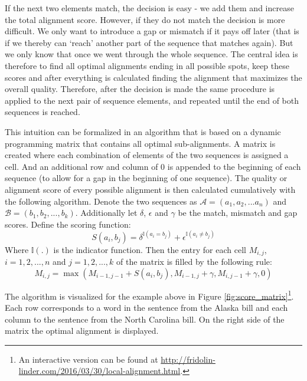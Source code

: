 \documentclass[12pt]{article} %
\begin{document}
If the next two elements match, the decision is easy - we add them and increase the total alignment score. However, if they do not match the decision is more difficult. We only want to introduce a gap or mismatch if it pays off later (that is if we thereby can `reach' another part of the sequence that matches again). But we only know that once we went through the whole sequence. The central idea is therefore to find all optimal alignments ending in all possible spots, keep these scores and after everything is calculated finding the alignment that maximizes the overall quality. Therefore, after the decision is made the same procedure is applied to the next pair of sequence elements, and repeated until the end of both sequences is reached.

This intuition can be formalized in an algorithm that is based on a dynamic programming matrix that contains all optimal sub-alignments. A matrix is created where each combination of elements of the two sequences is assigned a cell. And an additional row and column of 0 is appended to the beginning of each sequence (to allow for a gap in the beginning of one sequence). The quality or alignment score of every possible alignment is then calculated cumulatively with the following algorithm. Denote the two sequences as $\mathcal{A} = (a_1, a_2, ... a_n)$ and $\mathcal{B} = (b_1, b_2, ..., b_k)$. Additionally let $\delta$, $\epsilon$ and $\gamma$ be the match, mismatch and gap scores. Define the scoring function:
\begin{equation}
	\label{eqn:scoring}
	S(a_i, b_j) = \delta^{\mathbb{I}(a_i = b_j)} + \epsilon^{\mathbb{I}(a_i \neq b_j)}
\end{equation} 
Where $\mathbb{I}(.)$ is the indicator function. Then the entry for each cell $M_{i,j}$, $i=1,2,...,n$ and $j=1,2,...,k$ of the matrix is filled by the following rule:
\begin{equation}
	\label{eqn:fill}
	M_{i,j} = \max(M_{i-1,j-1} + S(a_i, b_j), M_{i-1,j} + \gamma, M_{i,j-1} + \gamma, 0)
\end{equation}

The algorithm is visualized for the example above in Figure
\ref{fig:score_matrix}\footnote{An interactive version can be found at
    \url{http://fridolin-linder.com/2016/03/30/local-alignment.html}.}. Each row corresponds to a word in the sentence from the Alaska bill and each column to the sentence from the North Carolina bill. On the right side of the matrix the optimal alignment is displayed.
\end{document}
